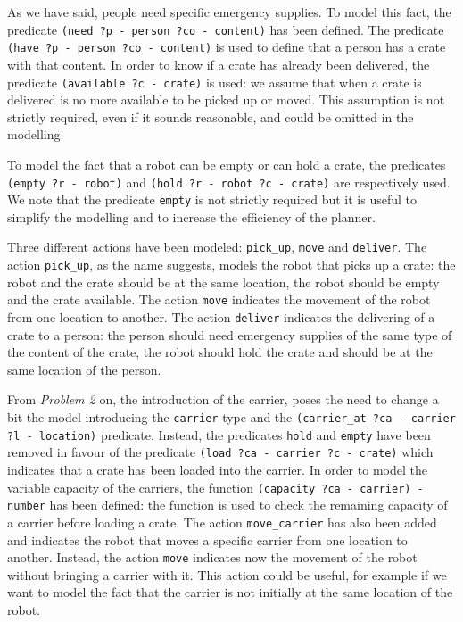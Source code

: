 As we have said, people need specific emergency supplies. To model this fact, the predicate
\texttt{(need ?p - person ?co - content)} has been defined. The predicate 
\texttt{(have ?p - person ?co - content)} is used to define that a person has a crate with that content.
In order to know if a crate has already been delivered, the predicate \texttt{(available ?c - crate)}
is used: we assume that when a crate is delivered is no more available to be picked up or moved.
This assumption is not strictly required, even if it sounds reasonable, and could be omitted in the modelling.


To model the fact that a robot can be empty or can hold a crate, the predicates \texttt{(empty ?r - robot)} and
\texttt{(hold ?r - robot ?c - crate)} are respectively used.
We note that the predicate \texttt{empty} is not strictly required but it is useful to simplify the modelling
and to increase the efficiency of the planner.


Three different actions have been modeled: \texttt{pick\_up}, 
\texttt{move} and \texttt{deliver}.
The action \texttt{pick\_up}, as the name suggests, models the robot that picks up a crate:
the robot and the crate should be at the same location, the robot should be empty and the crate available.
The action \texttt{move} indicates the movement of the robot from one location to another.
The action \texttt{deliver} indicates the delivering of a crate to a person: the person should need emergency
supplies of the same type of the content of the crate, the robot should hold the crate and should be at the 
same location of the person.


From \textit{Problem 2} on, the introduction of the carrier, poses the need to change a bit the model 
introducing the \texttt{carrier} type and the \texttt{(carrier\_at ?ca - carrier ?l - location)} predicate.
Instead, the predicates \texttt{hold} and \texttt{empty} have been removed in favour of the predicate
\texttt{(load ?ca - carrier ?c - crate)} which indicates that a crate has been loaded into the carrier.
In order to model the variable capacity of the carriers, the function \texttt{(capacity ?ca - carrier) - number}
has been defined: the function is used to check the remaining capacity of a carrier before loading a crate.
The action \texttt{move\_carrier} has also been added and indicates the robot that moves a specific carrier 
from one location to another.
Instead, the action \texttt{move} indicates now the movement of the robot without bringing a carrier with it.
This action could be useful, for example if we want to model the fact that the carrier is not initially at 
the same location of the robot.

